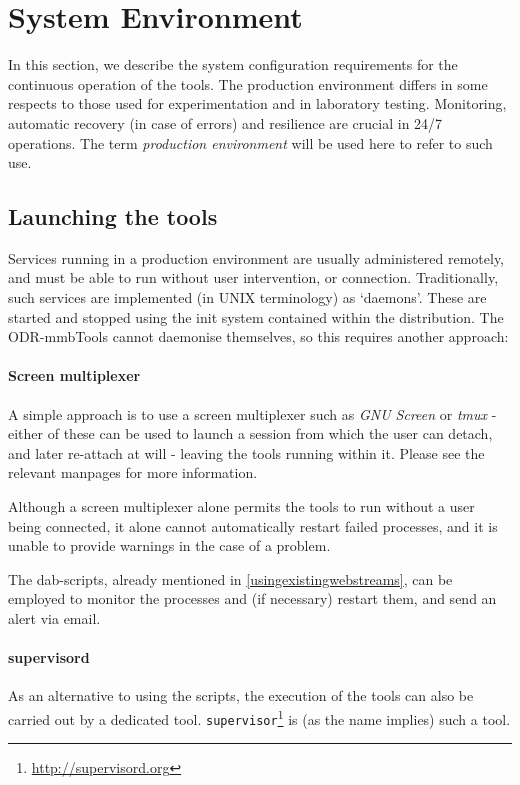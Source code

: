 \section{System Environment}

In this section, we describe the system configuration requirements for the
continuous operation of the tools. The production environment differs in some
respects to those used for experimentation and in laboratory testing. Monitoring,
automatic recovery (in case of errors) and resilience are crucial in 24/7
operations. The term \emph{production environment} will be used here to refer to
such use.

\subsection{Launching the tools}

Services running in a production environment are usually administered remotely,
and must be able to run without user intervention, or connection. Traditionally,
such services are implemented (in UNIX terminology) as `daemons'. These are
started and stopped using the init system contained within the distribution.
The ODR-mmbTools cannot daemonise themselves, so this requires another approach:

\paragraph{Screen multiplexer}
A simple approach is to use a screen multiplexer such as \emph{GNU Screen} or
\emph{tmux} - either of these can be used to launch a session from which the
user can detach, and later re-attach at will - leaving the tools running within
it. Please see the relevant manpages for more information.

Although a screen multiplexer alone permits the tools to run without a user
being connected, it alone cannot automatically restart failed processes, and it
is unable to provide warnings in the case of a problem.

The dab-scripts, already mentioned in \ref{usingexistingwebstreams}, can be
employed to monitor the processes and (if necessary) restart them, and send an
alert via email.

\paragraph{supervisord}
As an alternative to using the scripts, the execution of the tools can also be
carried out by a dedicated tool. \texttt{supervisor}\footnote{\url{http://supervisord.org}}
is (as the name implies) such a tool.


